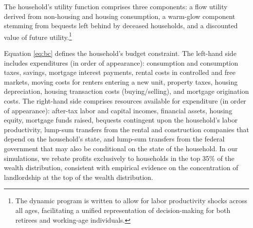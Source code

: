 \documentclass[parskip=full]{article}
\begin{document}
\noindent The household's utility function comprises three components: a flow utility derived from non-housing and housing consumption, a warm-glow component stemming from bequests left behind by deceased households, and a discounted value of future utility.\footnote{The dynamic program is written to allow for labor productivity shocks across all ages, facilitating a unified representation of decision-making for both retirees and working-age individuals.}

Equation \eqref{eq:bc} defines the household's budget constraint. The left-hand side includes expenditures (in order of appearance): consumption and consumption taxes, savings, mortgage interest payments, rental costs in controlled and free markets, moving costs for renters entering a new unit, property taxes, housing depreciation, housing transaction costs (buying/selling), and mortgage origination costs. The right-hand side comprises resources available for expenditure (in order of appearance): after-tax labor and capital incomes, financial assets, housing equity, mortgage funds raised, bequests contingent upon the household's labor productivity, lump-sum transfers from the rental and construction companies that depend on the household's state, and lump-sum transfers from the federal government that may also be conditional on the state of the household. In our simulations, we rebate profits exclusively to households in the top 35\% of the wealth distribution, consistent with empirical evidence on the concentration of landlordship at the top of the wealth distribution.
\end{document}
